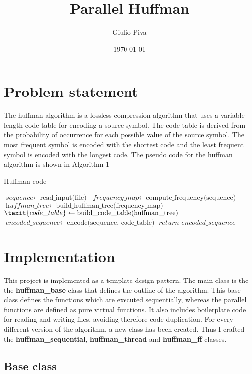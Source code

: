 \documentclass{report}
\title{Parallel Huffman}
\author{Giulio Piva}
\date{\today}
\begin{document}
\maketitle

\tableofcontents

\chapter{Problem statement}
The huffman algorithm is a lossless compression algorithm that uses a variable length code table
for encoding a source symbol. The code table is derived from the probability of occurrence for each
possible value of the source symbol. The most frequent symbol is encoded with the shortest code
and the least frequent symbol is encoded with the longest code.
The pseudo code for the huffman algorithm is shown in Algorithm 1

\begin{algorithm}
\caption{Huffman code}
\begin{algorithmic}[1]
\State $\textit{sequence} \gets \text{read\_input(file)}$
\State $\textit{frequency\_map} \gets \text{compute\_frequency(sequence)}$
\State $\textit{huffman\_tree} \gets \text{build\_huffman\_tree(frequency\_map)}$
\State $\texit{code\_table} \gets \text{build\_code\_table(huffman\_tree)}$
\State $\textit{encoded\_sequence} \gets \text{encode(sequence, code\_table)}$
\State $ \textit{return encoded\_sequence}$
\end{algorithmic}
\end{algorithm}

\chapter{Implementation}
This project is implemented as a template design pattern. The main class is the
the \textbf{huffman\_base} class that defines the outline of the algorithm.
This base class defines the functions which are executed sequentially, whereas
the parallel functions are defined as pure virtual functions.
It also includes boilerplate code for reading and writing files,
avoiding therefore code duplication.
For every different version of the algorithm, a new class has been created.
Thus I crafted the \textbf{huffman\_sequential}, \textbf{huffman\_thread} and
\textbf{huffman\_ff} classes.

\section*{Base class}
\end{document}
